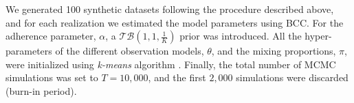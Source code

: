 We generated 100 synthetic datasets following the procedure described above, and for each realization we estimated the model parameters using BCC. For the adherence parameter, $\alpha$, a $\mathcal{TB}(1, 1, \frac{1}{K})$ prior was introduced. All the hyper-parameters of the different observation models, $\theta$, and the mixing proportions, $\pi$, were initialized using \emph{k-means} algorithm \citep{MacQueen1967}. Finally, the total number of MCMC simulations was set to $T=10,000$, and the first $2,000$ simulations were discarded (\ie burn-in period). 